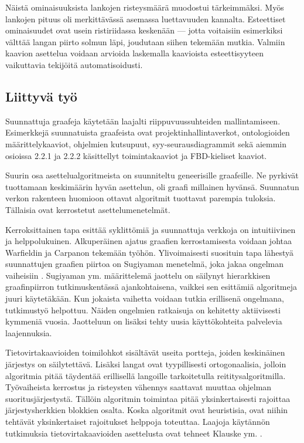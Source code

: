 \documentclass[finnish,12pt]{article}
\begin{document}
Näistä ominaisuuksista lankojen risteysmäärä muodostui tärkeimmäksi. Myös lankojen pituus oli merkittävässä asemassa luettavuuden kannalta.
Esteettiset ominaisuudet ovat usein ristiriidassa keskenään --- jotta voitaisiin esimerkiksi välttää langan piirto solmun läpi, joudutaan siihen tekemään mutkia.
Valmiin kaavion asettelua voidaan arvioida laskemalla kaavioista esteettisyyteen vaikuttavia tekijöitä automatisoidusti.


	\subsection{Liittyvä työ}

Suunnattuja graafeja käytetään laajalti riippuvuussuhteiden mallintamiseen.
Esimerkkejä suunnatuista graafeista ovat projektinhallintaverkot, ontologioiden määrittelykaaviot, ohjelmien kutsupuut, syy-seurausdiagrammit sekä aiemmin osioissa 2.2.1 ja 2.2.2 käsittellyt toimintakaaviot ja FBD-kieliset kaaviot.

Suurin osa asettelualgoritmeista on suunniteltu geneerisille graafeille.
Ne pyrkivät tuottamaan keskimäärin hyvän asettelun, oli graafi millainen hyvänsä.
Suunnatun verkon rakenteen huomioon ottavat algoritmit tuottavat parempia tuloksia.
Tällaisia ovat kerrostetut asettelumenetelmät.

Kerroksittainen tapa esittää syklittömiä ja suunnattuja verkkoja on intuitiivinen ja helppolukuinen.
Alkuperäinen ajatus graafien kerrostamisesta voidaan johtaa Warfieldin \cite{RefWorks:58} ja Carpanon \cite{RefWorks:57} tekemään työhön.
Ylivoimaisesti suosituin tapa lähestyä suunnattujen graafien piirtoa on Sugiyaman menetelmä, joka jakaa ongelman vaiheisiin \cite{RefWorks:9}.
Sugiyaman ym. määrittelemä jaottelu on säilynyt hierarkkisen graafinpiirron tutkimuskentässä ajankohtaisena, vaikkei sen esittämiä algoritmeja juuri käytetäkään.
Kun jokaista vaihetta voidaan tutkia erillisenä ongelmana, tutkimustyö helpottuu.
Näiden ongelmien ratkaisuja on kehitetty aktiivisesti kymmeniä vuosia.
Jaotteluun on lisäksi tehty uusia käyttökohteita palvelevia laajennuksia.

Tietovirtakaavioiden toimilohkot sisältävät useita portteja, joiden keskinäinen järjestys on säilytettävä.
Lisäksi langat ovat tyypillisesti ortogonaalisia, jolloin algoritmia pitää täydentää erillisellä langoille tarkoitetulla reititysalgoritmilla.
Työvaiheista kerrostus ja risteysten vähennys saattavat muuttaa ohjelman suoritusjärjestystä.
Tällöin algoritmin toimintaa pitää yksinkertaisesti rajoittaa järjestysherkkien blokkien osalta.
Koska algoritmit ovat heuristisia, ovat niihin tehtävät yksinkertaiset rajoitukset helppoja toteuttaa.
Laajoja käytännön tutkimuksia tietovirtakaavioiden asettelusta ovat tehneet Klauske ym. \cite{RefWorks:50}.
\end{document}
